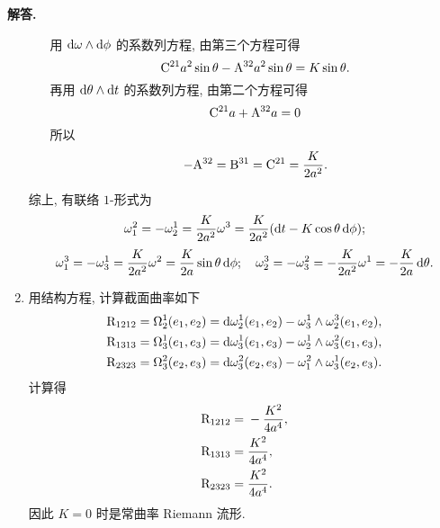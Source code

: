 \documentclass{ctexart}
\newenvironment{solution}{\par\noindent\textbf{解答. }}{\par}
\begin{document}
\begin{solution}
\begin{enumerate}[label = (\roman*)]
\begin{enumerate}
            用 $\mathop{}\!\mathrm{d} \omega \wedge \mathop{}\!\mathrm{d} \phi$ 的系数列方程, 由第三个方程可得
            \[
                \mathrm{C}^{21} a^2 \sin \theta - \mathrm{A}^{32} a^2 \sin \theta = K \sin \theta.
            \]
            再用 $\mathop{}\!\mathrm{d} \theta \wedge \mathop{}\!\mathrm{d} t$ 的系数列方程, 由第二个方程可得
            \[
                \mathrm{C}^{21} a + \mathrm{A}^{32} a = 0
            \]
            所以
            \[
                -\mathrm{A}^{32} = \mathrm{B}^{31} = \mathrm{C}^{21} = \dfrac{K }{2a^2}.
            \]
        \end{enumerate}
        综上, 有联络 $1$-形式为
        \[
            \omega^2_1 = -\omega^1_2 = \dfrac{K }{2a^2}\omega^3 = \dfrac{K }{2a^2}(\mathop{}\!\mathrm{d} t - K \cos \theta \mathop{}\!\mathrm{d} \phi);
        \]
        \[
            \omega^3_1 = -\omega^1_3 = \dfrac{K }{2a^2}\omega^2 = \dfrac{K}{2a}\sin \theta \mathop{}\!\mathrm{d} \phi; \quad \omega^3_2 = -\omega^2_3 = -\dfrac{K }{2a^2}\omega^1 = -\dfrac{K} {2a}\mathop{}\!\mathrm{d} \theta.
        \]
        \item 用结构方程, 计算截面曲率如下
        \[
            \begin{aligned}
            \mathrm{R}_{1212} = \Omega^1_2(e_1, e_2) = \mathop{}\!\mathrm{d} \omega^1_2(e_1, e_2) - \omega^1_3 \wedge \omega^3_2(e_1, e_2), \\
            \mathrm{R}_{1313} = \Omega^1_3(e_1, e_3) = \mathop{}\!\mathrm{d} \omega^1_3(e_1, e_3) - \omega^1_2 \wedge \omega^2_3(e_1, e_3), \\
            \mathrm{R}_{2323} = \Omega^2_3(e_2, e_3) = \mathop{}\!\mathrm{d} \omega^2_3(e_2, e_3) - \omega^2_1 \wedge \omega^1_3(e_2, e_3).
            \end{aligned}
        \]
        计算得
        \[
            \begin{aligned}
                \mathrm{R}_{1212} ={}& -\dfrac{K^2}{4a^4}, \\
                \mathrm{R}_{1313} ={}& \dfrac{K^2}{4a^4}, \\
                \mathrm{R}_{2323} ={}& \dfrac{K^2}{4a^4}.
            \end{aligned}
        \]
        因此 $K = 0$ 时是常曲率 Riemann 流形.
    \end{enumerate}
\end{solution}
\end{document}
